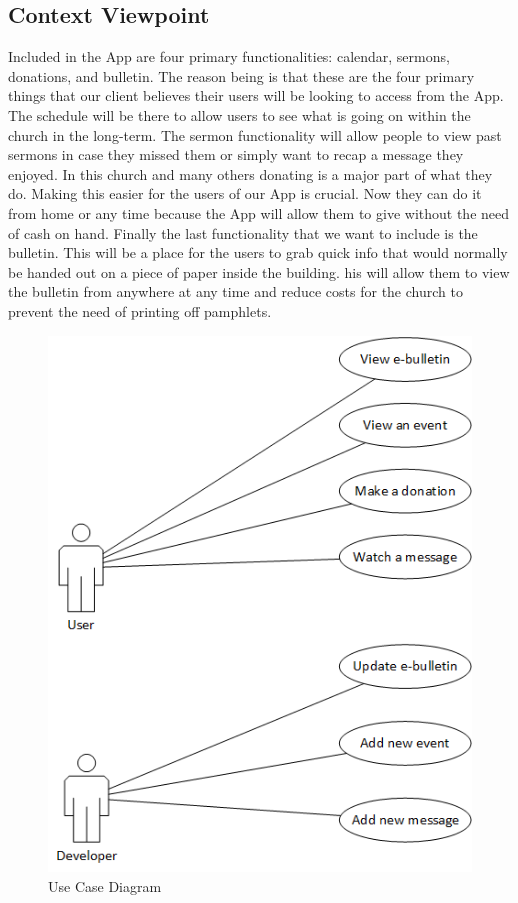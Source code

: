 \documentclass[letterpaper,10pt,draftclsnofoot,onecolumn,titlepage]{IEEEtran}
\begin{document}
		\subsection{Context Viewpoint}
		Included in the \gls{App} are four primary functionalities: calendar, sermons, donations, and bulletin.
		The reason being is that these are the four primary things that our client believes their users will be looking to access from the \gls{App}.
		The schedule will be there to allow users to see what is going on within the church in the long-term.
		The sermon functionality will allow people to view past sermons in case they missed them or simply want to recap a message they enjoyed.
		In this church and many others donating is a major part of what they do.
		Making this easier for the users of our \gls{App} is crucial.
		Now they can do it from home or any time because the \gls{App} will allow them to give without the need of cash on hand.
		Finally the last functionality that we want to include is the bulletin.
		This will be a place for the users to grab quick info that would normally be handed out on a piece of paper inside the building.
		his will allow them to view the bulletin from anywhere at any time and reduce costs for the church to prevent the need of printing off pamphlets.

		\begin{figure}[H]
			\centering
			\includegraphics[natwidth=462, natheight=585]{UseCase.png}
			\caption{Use Case Diagram}
			\label{fig:usecase}
		\end{figure}
\end{document}
